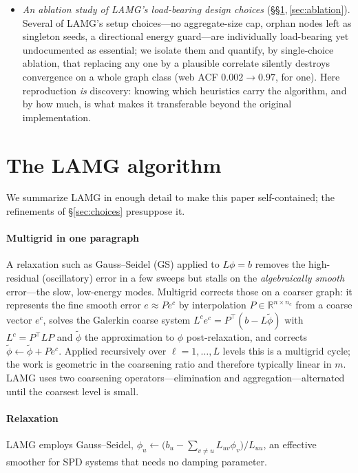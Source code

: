 \documentclass{siamart220329}
\newcommand{\acf}{\mathrm{ACF}}
\newcommand{\R}{\mathbb{R}}
\begin{document}
\begin{itemize}[leftmargin=1.4em,itemsep=1pt]
interpolation---turning LAMG's stalled
grid-aligned-anisotropy rate (Asymptotic Convergence Factor $(\acf)\approx0.99$) into $\approx0.11$ at $1\%$ median
overhead, each acting only on the locally anisotropic nodes that need it.
\item \emph{An ablation study of LAMG's load-bearing design choices} (\S\S\ref{sec:alg},\,\ref{sec:ablation}).
Several of LAMG's setup choices---no aggregate-size cap, orphan nodes left as singleton seeds, a
directional energy guard---are individually load-bearing yet undocumented as essential; we
isolate them and quantify, by single-choice ablation, that replacing any one by a plausible correlate
silently destroys convergence on a whole graph class (web ACF $0.002\!\to\!0.97$, for one). Here
reproduction \emph{is} discovery: knowing which heuristics carry the algorithm, and by how much, is
what makes it transferable beyond the original implementation.
\end{itemize}

\section{The LAMG algorithm}\label{sec:alg}
We summarize LAMG \cite{lamg} in enough detail to make this paper self-contained; the
refinements of \S\ref{sec:choices} presuppose it.

\paragraph{Multigrid in one paragraph} A relaxation such as Gauss--Seidel (GS) applied to
$L\phi=b$ removes the high-residual (oscillatory) error in a few sweeps but stalls on the
\emph{algebraically smooth} error---the slow, low-energy modes. Multigrid corrects those
on a coarser graph: it represents the fine smooth error $e\approx Pe^c$ by interpolation
$P\in\R^{n\times n_c}$ from a coarse vector $e^c$, solves the Galerkin coarse system
$L^c e^c=P^{\top}(b-L\tilde\phi)$ with $L^c=P^{\top}LP$ and $\tilde\phi$ the approximation to $\phi$ post-relaxation, and corrects
$\tilde\phi\leftarrow\tilde\phi+Pe^c$. Applied recursively over $\ell=1,\dots,L$ levels
this is a multigrid cycle; the work is geometric in the coarsening ratio and therefore typically linear in $m$.
LAMG uses two coarsening operators---elimination and aggregation---alternated until the
coarsest level is small.

\paragraph{Relaxation} LAMG employs Gauss--Seidel,
$\phi_u\leftarrow\big(b_u-\sum_{v\neq u}L_{uv}\phi_v\big)/L_{uu}$, an effective smoother
for SPD systems that needs no damping parameter.
\end{document}
